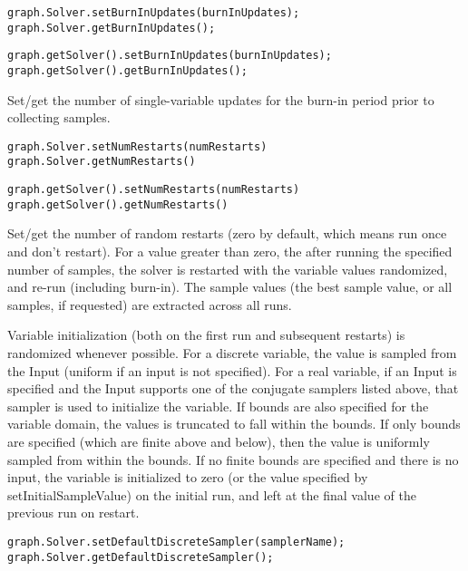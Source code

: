 \ifmatlab
\begin{lstlisting}
graph.Solver.setBurnInUpdates(burnInUpdates);
graph.Solver.getBurnInUpdates();
\end{lstlisting}
\fi

\ifjava
\begin{lstlisting}
graph.getSolver().setBurnInUpdates(burnInUpdates);
graph.getSolver().getBurnInUpdates();
\end{lstlisting}
\fi

Set/get the number of single-variable updates for the burn-in period prior to collecting samples.

\ifmatlab
\begin{lstlisting}
graph.Solver.setNumRestarts(numRestarts)
graph.Solver.getNumRestarts() 
\end{lstlisting}
\fi

\ifjava
\begin{lstlisting}
graph.getSolver().setNumRestarts(numRestarts)
graph.getSolver().getNumRestarts() 
\end{lstlisting}
\fi

Set/get the number of random restarts (zero by default, which means run once and don't restart).  For a value greater than zero, the after running the specified number of samples, the solver is restarted with the variable values randomized, and re-run (including burn-in).  The sample values (the best sample value, or all samples, if requested) are extracted across all runs.

Variable initialization (both on the first run and subsequent restarts) is randomized whenever possible.  For a discrete variable, the value is sampled from the Input (uniform if an input is not specified).  For a real variable, if an Input is specified and the Input supports one of the conjugate samplers listed above, that sampler is used to initialize the variable.  If bounds are also specified for the variable domain, the values is truncated to fall within the bounds.  If only bounds are specified (which are finite above and below), then the value is uniformly sampled from within the bounds.  If no finite bounds are specified and there is no input, the variable is initialized to zero (or the value specified by setInitialSampleValue) on the initial run, and left at the final value of the previous run on restart.


\ifmatlab
\begin{lstlisting}
graph.Solver.setDefaultDiscreteSampler(samplerName);
graph.Solver.getDefaultDiscreteSampler();
\end{lstlisting}
\fi

